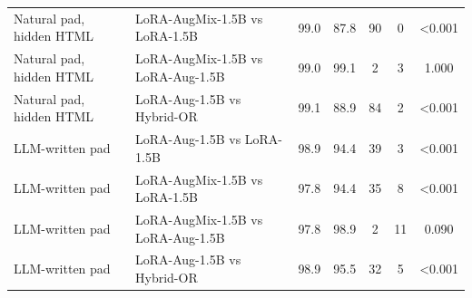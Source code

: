 \begin{table}[t]
\begin{tabular}{llccccc}
Natural pad, hidden HTML & LoRA-AugMix-1.5B vs LoRA-1.5B & 99.0 & 87.8 & 90 & 0 & <0.001 \\
Natural pad, hidden HTML & LoRA-AugMix-1.5B vs LoRA-Aug-1.5B & 99.0 & 99.1 & 2 & 3 & 1.000 \\
Natural pad, hidden HTML & LoRA-Aug-1.5B vs Hybrid-OR & 99.1 & 88.9 & 84 & 2 & <0.001 \\
LLM-written pad & LoRA-Aug-1.5B vs LoRA-1.5B & 98.9 & 94.4 & 39 & 3 & <0.001 \\
LLM-written pad & LoRA-AugMix-1.5B vs LoRA-1.5B & 97.8 & 94.4 & 35 & 8 & <0.001 \\
LLM-written pad & LoRA-AugMix-1.5B vs LoRA-Aug-1.5B & 97.8 & 98.9 & 2 & 11 & 0.090 \\
LLM-written pad & LoRA-Aug-1.5B vs Hybrid-OR & 98.9 & 95.5 & 32 & 5 & <0.001 \\
\bottomrule
\end{tabular}
\end{table}
